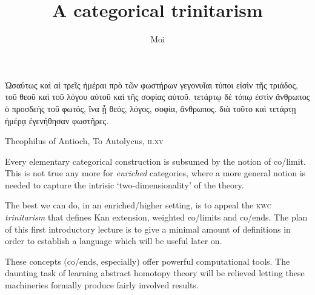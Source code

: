 \documentclass[a4paper,12pt]{amsart}
\title{A categorical trinitarism}
\author{Moi}
\begin{document}
\maketitle
\epigraph{
\textgreek{
Ὡσαύτως καὶ αἱ τρεῖς ἡμέραι πρὸ τῶν φωστήρων γεγονυῖαι τύποι εἰσὶν τῆς τριάδος, τοῦ θεοῦ καὶ τοῦ λόγου αὐτοῦ καὶ τῆς σοφίας αὐτοῦ. τετάρτῳ δὲ τόπῳ ἐστὶν ἄνθρωπος ὁ προσδεὴς τοῦ φωτός, ἵνα ᾖ θεός, λόγος, σοφία, ἄνθρωπος. διὰ τοῦτο καὶ τετάρτῃ ἡμέρᾳ ἐγενήθησαν φωστῆρες.}}{Theophilus of Antioch, To Autolycus, \textsc{ii.xv}}
Every elementary categorical construction is subsumed by the notion of co/limit. This is not true any more for \emph{enriched} categories, where a more general notion is needed to capture the intrisic `two-dimensionality' of the theory.

The best we can do, in an enriched/higher setting, is to appeal the \textsc{kwc} \emph{trinitarism} that defines Kan extension, weighted co/limits and co/ends. The plan of this first introductory lecture is to give a minimal amount of definitions in order to establish a language which will be useful later on.

These concepts (co/ends, especially) offer powerful computational tools. The daunting task of learning abstract homotopy theory will be relieved letting these machineries formally produce fairly involved results.
\end{document}
